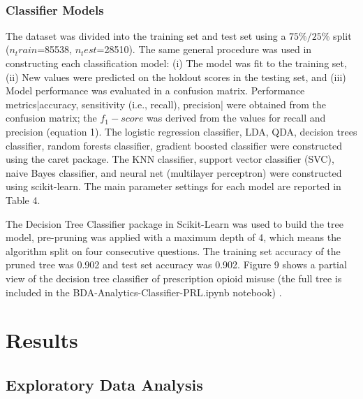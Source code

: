 \\\documentclass[sigconf]{acmart}
\begin{document}

\subsubsection{Classifier Models}

The dataset was divided into the training set and test set using a $75\%/25\%$  
split ($n_train$=85538, $n_test$=28510). The same general procedure was used in 
constructing each classification model: (i) The model was fit to the training 
set, (ii) New values were predicted on the holdout scores in the testing set, 
and (iii) Model performance was evaluated in a confusion matrix. Performance 
metrics|accuracy, sensitivity (i.e., recall), precision| were obtained from 
the confusion matrix; the $f_1-score$ was derived from the values for recall 
and precision (equation 1). The logistic regression classifier, LDA, QDA, 
decision trees classifier, random forests classifier, gradient boosted 
classifier were constructed using the caret package. The KNN classifier, 
support vector classifier (SVC), naive Bayes classifier, and neural net 
(multilayer perceptron) were constructed using scikit-learn. The main 
parameter settings for each model are reported in Table 4. 




The Decision Tree Classifier package in Scikit-Learn was used to build the 
tree model, pre-pruning was applied with a maximum depth of 4, which means 
the algorithm split on four consecutive questions. The training set accuracy 
of the pruned tree was 0.902 and test set accuracy was 0.902. Figure 9 shows 
a partial view of the decision tree classifier of prescription opioid misuse
(the full tree is included in the BDA-Analytics-Classifier-PRL.ipynb 
notebook) \cite{classifyPRL}. 

\section{Results}

\subsection{Exploratory Data Analysis}
\end{document}
